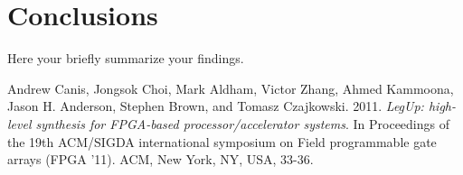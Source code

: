 \documentclass[12pt,a4paper]{article}
\begin{document}
\section{Conclusions}
Here your briefly summarize your findings.


\begin{thebibliography}{99}

Andrew Canis, Jongsok Choi, Mark Aldham, Victor Zhang, Ahmed Kammoona, Jason H. 
Anderson, Stephen Brown, and Tomasz Czajkowski. 2011. \textit{LegUp: high-level 
synthesis for FPGA-based processor/accelerator systems}. In Proceedings of the 
19th ACM/SIGDA international symposium on Field programmable gate arrays (FPGA 
'11). ACM, New York, NY, USA, 33-36. 

\end{thebibliography}
\end{document}
